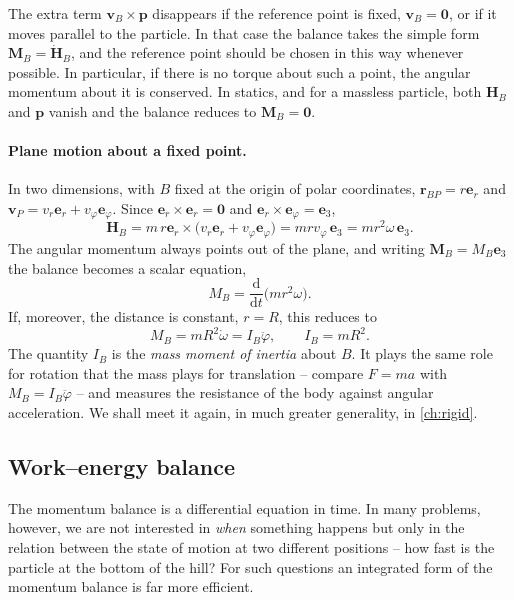 \documentclass[11pt,a4paper,oneside]{report}
\numberwithin{equation}{chapter}
\newcommand{\vect}[1]{\bm{#1}}
\newcommand{\e}[1]{\vect{e}_{#1}}
\newcommand{\dv}[2]{\frac{\mathrm{d}#1}{\mathrm{d}#2}}
\theoremstyle{plain}
\theoremstyle{definition}
\theoremstyle{remark}
\newcommand{\lecture}[2]{\marginpar{\raggedright\footnotesize\textsc{Lecture #1}\\\textit{#2}}}
\begin{document}
The extra term $\vect v_B\times\vect p$ disappears if the reference point is fixed, $\vect v_B=\vect 0$, or if it moves
parallel to the particle. In that case the balance takes the simple form $\vect M_B=\dot{\vect H}_B$, and the
reference point should be chosen in this way whenever possible. In particular, if there is no torque about such a
point, the angular momentum about it is conserved. In statics, and for a massless particle, both $\vect H_B$ and
$\vect p$ vanish and the balance reduces to $\vect M_B=\vect 0$.

\paragraph{Plane motion about a fixed point.}
In two dimensions, with $B$ fixed at the origin of polar coordinates, $\vect r_{BP}=r\e r$ and
$\vect v_P=v_r\e r+v_\varphi\e\varphi$. Since $\e r\times\e r=\vect 0$ and $\e r\times\e\varphi=\e3$,
\[
  \vect H_B=m\,r\e r\times\big(v_r\e r+v_\varphi\e\varphi\big)=mrv_\varphi\,\e3=mr^2\omega\,\e3 .
\]
The angular momentum always points out of the plane, and writing $\vect M_B=M_B\e3$ the balance becomes a scalar
equation,
\begin{equation}
  M_B=\dv{}{t}\big(mr^2\omega\big).
\end{equation}
If, moreover, the distance is constant, $r=R$, this reduces to
\begin{equation}
  M_B=mR^2\dot\omega=I_B\ddot\varphi,\qquad I_B=mR^2 .
\end{equation}
The quantity $I_B$ is the \emph{mass moment of inertia} about $B$. It plays the same role for rotation that the
mass plays for translation -- compare $F=ma$ with $M_B=I_B\ddot\varphi$ -- and measures the resistance of the body
against angular acceleration. We shall meet it again, in much greater generality, in \cref{ch:rigid}.

\subsection{Work--energy balance}\label{sec:web}
\lecture{4}{28.09.2026}
The momentum balance is a differential equation in time. In many problems, however, we are not interested in
\emph{when} something happens but only in the relation between the state of motion at two different positions --
how fast is the particle at the bottom of the hill? For such questions an integrated form of the momentum balance
is far more efficient.
\end{document}

